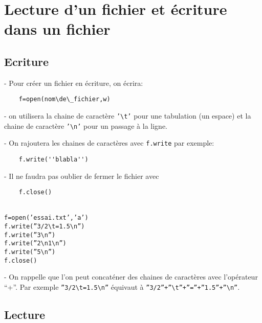 \def\t{\textbackslash t}
\def\n{\textbackslash n}

\section*{Lecture d'un fichier et écriture dans un fichier}
	
\subsection*{Ecriture}

 - Pour créer un fichier en écriture, on écrira:

\begin{lstlisting}
	f=open(nom\de\_fichier,w)
\end{lstlisting}

- on utilisera la chaine de caractère \texttt{'\t'} pour une tabulation (un espace) et la chaine de caractère \texttt{'\n'} pour un passage à la ligne.

- On rajoutera les chaines de caractères avec \texttt{f.write} par exemple:

\begin{lstlisting}
	f.write(''blabla'')
\end{lstlisting}

- Il ne faudra pas oublier de fermer le fichier avec 

\begin{lstlisting}
	f.close()
\end{lstlisting}


\begin{exemple}
	\ \\[1mm]
	\texttt{f=open('essai.txt','a')}	\\
	\texttt{f.write(''3/2\t=1.5\n'')}\\
	\texttt{f.write(''3\n'')}\\
	\texttt{f.write(''2\n1\n'')}\\
	\texttt{f.write(''5\n'')}\\
	\texttt{f.close()}
\end{exemple}

- On rappelle que l'on peut concaténer des chaines de caractères avec l'opérateur “+”. Par exemple \texttt{''3/2\t=1.5\n''} équivaut à \texttt{''3/2''+''\t''+''=''+''1.5''+''\n''}.


\subsection*{Lecture}

